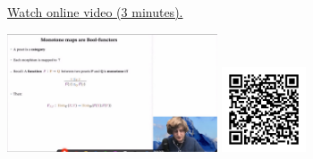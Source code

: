 
\begin{minipage}{10cm}
    \href{https://act4e-spring21.netlify.app/videos/spring2021-enrichment:monotone-maps-bool-func.html}{Watch online video (3 minutes).}
        
    \href{https://act4e-spring21.netlify.app/videos/spring2021-enrichment:monotone-maps-bool-func.html}{\includegraphics[height=3.5cm]{spring2021-enrichment:monotone-maps-bool-func/thumbnails.jpg}}
    \href{https://act4e-spring21.netlify.app/videos/spring2021-enrichment:monotone-maps-bool-func.html}{\includegraphics[height=2.5cm]{spring2021-enrichment:monotone-maps-bool-func/qrcode.png}}
\end{minipage}
